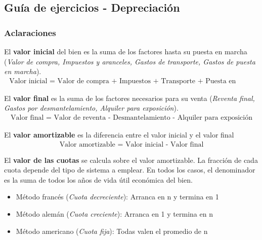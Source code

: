 \documentclass[12pt,a4paper]{article}
\begin{document}
    
    \newpage
    
    \subsection{Guía de ejercicios - Depreciación}
    
        
        \subsubsection{Aclaraciones}
        
        \par{\hspace{0.5cm}
        	El \textbf{valor inicial} del bien es la suma de los factores hasta su puesta en marcha (\textsl{Valor de compra, Impuestos y aranceles, Gastos de transporte, Gastos de puesta en marcha}).
            \begin{align}
            	\text{ Valor inicial = Valor de compra + Impuestos + Transporte + Puesta en marcha }
                \label{valor_inicial}
			\end{align}
            
            El \textbf{valor final} es la suma de los factores necesarios para su venta (\textsl{Reventa final, Gastos por desmantelamiento, Alquiler para exposición}).
            \begin{align}
            	\text{ Valor final = Valor de reventa - Desmantelamiento - Alquiler para exposición }
                \label{valor_final}
			\end{align}
            
            El \textbf{valor amortizable} es la diferencia entre el valor inicial y el valor final
            \begin{align}
            	\text{ Valor amortizable = Valor inicial - Valor final }
                \label{valor_amortizable}
			\end{align}
            
            El \textbf{valor de las cuotas} se calcula sobre el valor amortizable.
            La fracción de cada cuota depende del tipo de sistema a emplear.
            En todos los casos, el denominador es la suma de todos los años de vida útil económica del bien.
            \begin{itemize}
				\item	Método francés (\textsl{Cuota decreciente}): Arranca en n y termina en 1
				\item	Método alemán (\textsl{Cuota creciente}): Arranca en 1 y termina en n
				\item	Método americano (\textsl{Cuota fija}): Todas valen el promedio de n
			\end{itemize}
            
}
\end{document}

